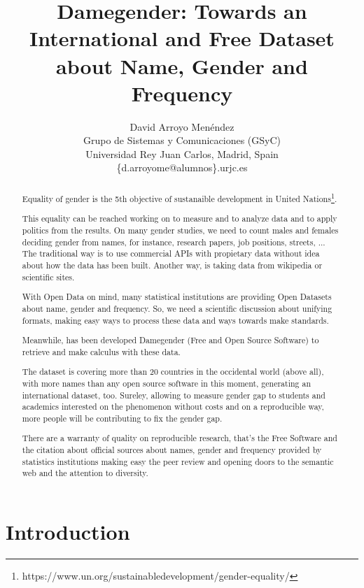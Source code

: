 \documentclass[a4paper]{article}
\title{Damegender: Towards an International and Free Dataset about Name, Gender and Frequency}
\author{
David Arroyo Menéndez \\ Grupo de Sistemas y Comunicaciones (GSyC) \\ Universidad Rey Juan Carlos, Madrid, Spain \\ \{d.arroyome@alumnos\}.urjc.es
}
\begin{document}
\maketitle

\begin{abstract}

  Equality of gender is the 5th objective of sustanaible development
  in United
  Nations\footnote{https://www.un.org/sustainabledevelopment/gender-equality/}.

  This equality can be reached working on to measure and to analyze
  data and to apply politics from the results. On many gender studies,
  we need to count males and females deciding gender from names, for
  instance, research papers, job positions, streets, ... The
  traditional way is to use commercial APIs with propietary data
  without idea about how the data has been built. Another way, is
  taking data from wikipedia or scientific sites.


  With Open Data on mind, many statistical institutions are providing
  Open Datasets about name, gender and frequency. So, we need a
  scientific discussion about unifying formats, making easy ways to
  process these data and ways towards make standards.

  Meanwhile, has been developed Damegender (Free and Open Source
  Software) to retrieve and make calculus with these data.

  
  The dataset is covering more than 20 countries in the occidental
  world (above all), with more names than any open source software in
  this moment, generating an international dataset, too. Sureley,
  allowing to measure gender gap to students and academics interested
  on the phenomenon without costs and on a reproducible way, more
  people will be contributing to fix the gender gap.


  There are a warranty of quality on reproducible research, that's the
  Free Software and the citation about official sources about names,
  gender and frequency provided by statistics institutions making easy
  the peer review and opening doors to the semantic web and the
  attention to diversity.
  
\end{abstract}



\section{Introduction}
\end{document}
